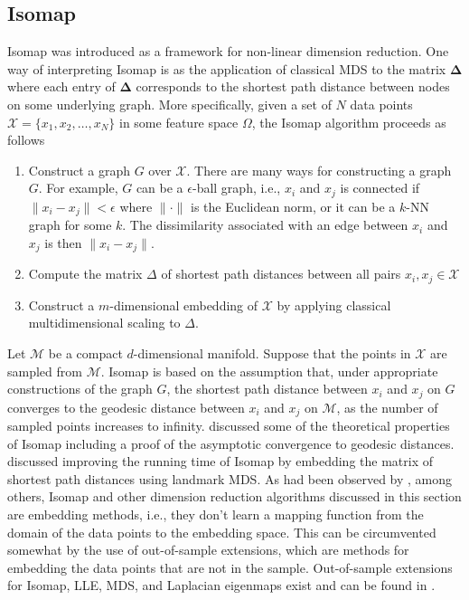 \subsection{Isomap}
\label{sec:isomap}
Isomap \citep{tenebaum00:_global_geomet_framew_nonlin_dimen_reduc} was
introduced as a framework for non-linear dimension reduction. One
way of interpreting Isomap is as the application of classical MDS to
the matrix $\bm{\Delta}$ where each entry of $\bm{\Delta}$ corresponds
to the shortest path distance between nodes on some underlying
graph. More specifically, given a set of $N$ data points $\mathcal{X}
= \{x_1, x_2, \dots, x_N\}$ in some feature space $\Omega$,
the Isomap algorithm proceeds as follows
\begin{enumerate}
\item Construct a graph $G$ over $\mathcal{X}$. There are many ways
  for constructing a graph $G$. For example, $G$ can be a
  $\epsilon$-ball graph, i.e., $x_i$ and $x_j$ is connected if $\|x_i
  - x_j\| < \epsilon$ where $\| \cdot \|$ is the Euclidean norm, or it
  can be a $k$-NN graph for some $k$. The dissimilarity associated
  with an edge between $x_i$ and $x_j$ is then $\|x_i - x_j \|$.
\item Compute the matrix $\Delta$ of shortest path distances between
  all pairs $x_i, x_j \in \mathcal{X}$
\item Construct a $m$-dimensional embedding of $\mathcal{X}$ by
  applying classical multidimensional scaling to $\Delta$.  
\end{enumerate}
Let $\mathcal{M}$ be a compact $d$-dimensional manifold. Suppose that
the points in $\mathcal{X}$ are sampled from $\mathcal{M}$. Isomap is
based on the assumption that, under appropriate constructions of the
graph $G$, the shortest path distance between $x_i$ and $x_j$ on $G$
converges to the geodesic distance between $x_i$ and $x_j$ on
$\mathcal{M}$, as the number of sampled points increases to
infinity. \citet{bernstein00:_graph} discussed some of the theoretical
properties of Isomap including a proof of the asymptotic convergence
to geodesic distances. \citet{silva02:_global} discussed improving the
running time of Isomap by embedding the matrix of shortest path
distances using landmark MDS. As had been observed by
\citet{brand05:_chart}, among others, Isomap and other dimension
reduction algorithms discussed in this section are embedding methods,
i.e., they don't learn a mapping function from the domain of the data
points to the embedding space. This can be circumvented somewhat by
the use of out-of-sample extensions, which are methods for embedding
the data points that are not in the sample. Out-of-sample extensions for
Isomap, LLE, MDS, and Laplacian eigenmaps exist and can be found in
\citet{bengio04:_out_lle_isomap_mds_eigen,trosset08}.
%
%
